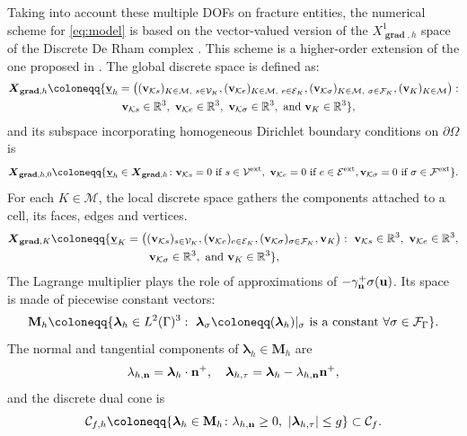 \documentclass[a4paper,11pt]{article}
\theoremstyle{definition}
\theoremstyle{remark}
\newcommand{\uvec}[1]{\underline{\mathbf{#1}}}
\newcommand{\bo}[1]{\mathbf{#1}}
\def\ext{\text{ext}}
\def\cC{\mathcal{C}}
\def\cE{\mathcal{E}}
\def\cF{\mathcal{F}}
\def\cK{\mathcal{K}}
\def\cM{\mathcal{M}}
\def\cV{\mathcal{V}}
\def\blambda{\boldsymbol{\lambda}}
\def\dls{\boldsymbol{X}_{{\bf grad},K}}
\def\dgs{\boldsymbol{X}_{{\bf grad},h}}
\def\ddgs{\boldsymbol{X}_{{\bf grad},h,0}}
\def\O{\Omega}
\newcommand{\Ks}{{\mathcal{K}s}}
\newcommand{\Ke}{{\mathcal{K}e}}
\begin{document}
Taking into account these multiple DOFs on fracture entities, the numerical scheme for \eqref{eq:model} is based on the vector-valued version of the $X_{\mathop{\mathbf{grad}},h}^1$ space of the Discrete De Rham complex \cite{pjddr}. This scheme is a higher-order extension of the one proposed in \cite{droniou2023bubble,jhr}.
The global discrete space is defined as: 
\begin{align*}%
\begin{split}
\dgs\coloneqq\{\uvec{v}_h&=\big((\bo{v}_{\Ks})_{K\in\cM,~s\in \mathcal{V}_K},(\bo{v}_{\Ke})_{K\in\cM,~e\in \mathcal{E}_K},(\bo{v}_{\cK\sigma})_{K\in\cM,~\sigma\in\cF_K},(\bo{v}_K)_{K\in\cM}\big):\\&~\bo{v}_{\Ks}\in \mathbb R^3,~\bo{v}_{\Ke}\in\mathbb R^3,~\bo{v}_{\cK\sigma}\in\mathbb R^3,\text{ and }\bo{v}_K\in\mathbb R^3\},%
\end{split}
\end{align*}
and its subspace incorporating homogeneous Dirichlet boundary conditions on $\partial\O$ is
\begin{align*}%
\ddgs\coloneqq\{\uvec{v}_h\in\dgs\colon \bo{v}_{\Ks}=0 ~\text{if }s\in\cV^{\ext},~\bo{v}_{\Ke}=0\text{ if }e\in\cE^{\ext},\bo{v}_{\cK\sigma}=0 \text{ if }\sigma\in \cF^{\ext}\}.
\end{align*}
For each $K\in\cM$, the local discrete space gathers the components attached to a cell, its faces, edges and vertices.
\begin{align*}%
\begin{split}
\dls\coloneqq\{\uvec{v}_K&=\big((\bo{v}_{\Ks})_{s\in \mathcal{V}_K},(\bo{v}_{\Ke})_{e\in \mathcal{E}_K},(\bo{v}_{\cK\sigma})_{\sigma\in\cF_K},\bo{v}_K\big):~\bo{v}_{\Ks}\in \mathbb R^3,~\bo{v}_{\Ke}\in\mathbb R^3,\\&\qquad\bo{v}_{\cK\sigma}\in\mathbb R^3,\text{ and }\bo{v}_K\in\mathbb R^3\},%
\end{split}
\end{align*}
The Lagrange multiplier plays the role of approximations of $-\gamma^+_{\bf n}\sigma({\bf u})$. Its space is made of piecewise constant vectors:
\begin{equation*}%
{\bf M}_{h}\coloneqq\{\blambda_h\in L^2(\Gamma)^3:~\blambda_\sigma\coloneqq(\blambda_h)|_\sigma \text{ is a constant }\forall\sigma\in\cF_{\Gamma}\}.
\end{equation*}
The normal and tangential components of $\blambda_h\in\mathbf{M}_h$ are
\begin{equation*}
\lambda_{h,{\bf n}}=\blambda_h\cdot{\bf n}^+, \quad\blambda_{h,\tau}=\blambda_h-\lambda_{h,{\bf n}}{\bf n}^+,
\end{equation*}
and the discrete dual cone is
\begin{equation*}%
\cC_{f,h}\coloneqq\{\blambda_h\in{\bf M}_h\colon \lambda_{h,{\bf n}}\geq 0,~\lvert \blambda_{h,\tau}\rvert\leq g\}\subset\cC_f.
\end{equation*}
\end{document}
